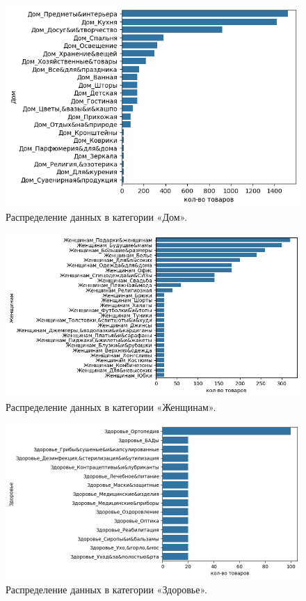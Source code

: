 \documentclass[a4paper,12pt]{extarticle}
\begin{document}
\begin{figure}[hbtp]
	\centering
	\includegraphics[scale=0.8]{приложения/amount_of_category_Дом.png}
	\caption{Распределение данных в категории «Дом».}
	\label{fig:amount_of_category_Дом}
\end{figure}

\begin{figure}[hbtp]
	\centering
	\includegraphics[scale=0.8]{приложения/amount_of_category_Женщинам.png}
	\caption{Распределение данных в категории «Женщинам».}
	\label{fig:amount_of_category_Женщинам}
\end{figure}

\begin{figure}[hbtp]
	\centering
	\includegraphics[scale=0.8]{приложения/amount_of_category_Здоровье.png}
	\caption{Распределение данных в категории «Здоровье».}
	\label{fig:amount_of_category_Здоровье}
\end{figure}
\end{document}
